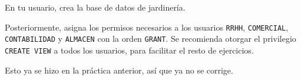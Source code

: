 \begin{homeworkProblem}
  En tu usuario, crea la base de datos de jardinería.

  Posteriormente, asigna los permisos necesarios a los usuarios \texttt{RRHH}, \texttt{COMERCIAL}, \texttt{CONTABILIDAD} y \texttt{ALMACEN} con la orden \texttt{GRANT}.   Se recomienda otorgar el privilegio \texttt{CREATE VIEW} a todos los usuarios, para facilitar el resto de ejercicios.
  
  \begin{Aviso}
    Esto ya se hizo en la práctica anterior, así que ya no se corrige.

  \end{Aviso}

  
\end{homeworkProblem}




